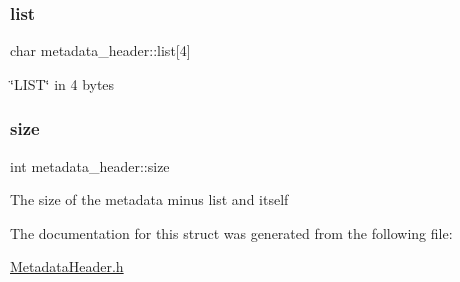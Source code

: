 \subsubsection{\texorpdfstring{list}{list}}
{\footnotesize\ttfamily char metadata\+\_\+header\+::list\mbox{[}4\mbox{]}}

\char`\"{}\+L\+I\+S\+T\char`\"{} in 4 bytes \mbox{\label{structmetadata__header_a225077991d32dcc769f7dcb9185c4025}} 
\subsubsection{\texorpdfstring{size}{size}}
{\footnotesize\ttfamily int metadata\+\_\+header\+::size}

The size of the metadata minus list and itself 

The documentation for this struct was generated from the following file\+:\begin{DoxyCompactItemize}
\item 
\hyperlink{MetadataHeader_8h}{Metadata\+Header.\+h}\end{DoxyCompactItemize}
